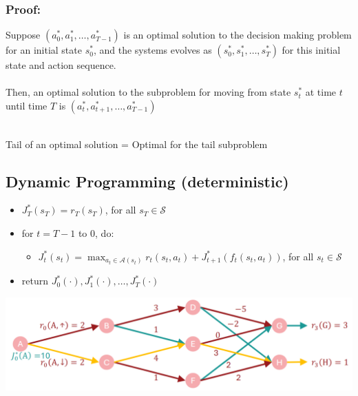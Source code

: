 \documentclass[10pt]{article}
\begin{document}
\subsubsection*{Proof:}
Suppose $(a_0^*, a_1^*, \dots, a_{T - 1}^*)$ is an optimal solution to the decision making problem for an initial state $s_0^*$, and the systems evolves as $(s_0^*, s_1^*, \dots, s_T^*)$ for this initial state and action sequence.\\\\
Then, an optimal solution to the subproblem for moving from state $s_t^*$ at time $t$ until time $T$ is $(a_t^*, a_{t + 1}^*, \dots, a_{T - 1}^*)$\\\\
\begin{center}
Tail of an optimal solution = Optimal for the tail subproblem
\end{center}

\subsection*{Dynamic Programming (deterministic)}
\begin{itemize}
	\item $J_T^*(s_T) = r_T(s_T)$, for all $s_T \in \mathcal{S}$
	\item for $t = T - 1$ to $0$, do:
	\begin{itemize}
        \item $J_t^*(s_t) = \max_{a_t \in \mathcal{A}(s_t)} r_t(s_t, a_t) + J_{t + 1}^* (f_t(s_t, a_t))$, for all $s_t \in \mathcal{S}$
    \end{itemize}
    \item return $J_0^*(\cdot), J_1^*(\cdot), \dots, J_T^*(\cdot)$
\end{itemize}
\begin{center} 
	\includegraphics*[width=\textwidth]{L2_1.png} 
\end{center}
\end{document}

